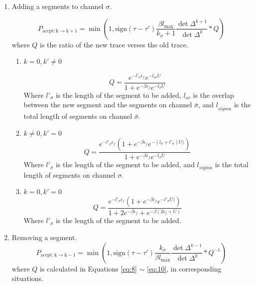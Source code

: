 \begin{enumerate}
  \item Adding a segments to channel $\sigma$.

    \begin{equation}
      P_\mathrm{accpt:k\rightarrow k+1}=\min\left(1,\mathrm{sign}(\tau-\tau')
        \frac{\beta l_\mathrm{max}}{k_\sigma +1} \frac{\det\Delta^{k+1}}{\det\Delta^k}
        *Q
      \right)
\end{equation}
where $Q$ is the ratio of the new trace verses the old trace. 

    \begin{enumerate}
    \item{$k=0,k'\neq 0$}

      \begin{equation}
        \label{eq:8}
        Q=
        \frac{e^{-l'_\sigma\epsilon_f}e^{-l_{ov}U}}
        {1+e^{-\beta\epsilon_f}e^{-l_{\bar\sigma} U}}
      \end{equation}
      Where $l'_\sigma$ is the length of the segment to be added, 
      $l_{ov}$ is the overlap between the new segment and the segments on channel $\bar\sigma$,
      and $l_{\bar{sigma}}$ is the total length of segments on channel $\bar\sigma$.

    \item{$k\neq 0,k'=0$}
      \begin{equation}
        \label{eq:9}
        Q=
        \frac{e^{-l'_{\sigma}\epsilon_f}(1+e^{-\beta\epsilon_f}e^{-(l_\sigma+l'_{\sigma})U)})}
        {1+e^{-\beta\epsilon_f}e^{-l_{\sigma} U}}
      \end{equation}
      Where $l'_\sigma$ is the length of the segment to be added, 
      and $l_{sigma}$ is the total length of segments on channel $\sigma$.
    
    
  \item{$k=0,k'=0$}
    \begin{equation}
        \label{eq:10}
        Q=
        \frac{e^{-l'_{\sigma}\epsilon_f}(1+e^{-\beta\epsilon_f}e^{-l'_{\sigma} U)})}
        {1+2e^{-\beta\epsilon_f}+e^{-\beta(2\epsilon_f+U)}}
      \end{equation}
      Where $l'_\sigma$ is the length of the segment to be added.
   
    \end{enumerate}

  \item Removing a segment.
    \begin{equation}
      P_\mathrm{accpt:k\rightarrow k-1}=\min\left(1,\mathrm{sign}(\tau-\tau')
        \frac{k_\sigma}{\beta l_\mathrm{max}} \frac{\det\Delta^{k-1}}{\det\Delta^k}
        *Q^{-1}
      \right)
    \end{equation}
    where $Q$ is calculated in Equations \ref{eq:8} $\sim$ \ref{eq:10}, in
    corresponding situations.
 

\end{enumerate}
